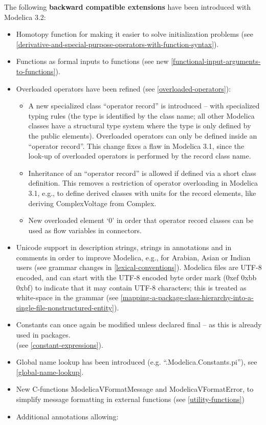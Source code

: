 The following \textbf{backward compatible extensions} have been
introduced with Modelica 3.2:

\begin{itemize}
\item
  Homotopy function for making it easier to solve initialization
  problems (see \ref{derivative-and-special-purpose-operators-with-function-syntax}).
\item
  Functions as formal inputs to functions (see new \ref{functional-input-arguments-to-functions}).
\item
  Overloaded operators have been refined (see \ref{overloaded-operators}):

  \begin{itemize}
  \item
    A new specialized class ``operator record'' is introduced -- with
    specialized typing rules (the type is identified by the class name;
    all other Modelica classes have a structural type system where the
    type is only defined by the public elements). Overloaded operators
    can only be defined inside an ``operator record''. This change fixes
    a flaw in Modelica 3.1, since the look-up of overloaded operators is
    performed by the record class name.
  \item
    Inheritance of an ``operator record'' is allowed if defined via a
    short class definition. This removes a restriction of operator
    overloading in Modelica 3.1, e.g., to define derived classes with
    units for the record elements, like deriving ComplexVoltage from
    Complex.
  \item
    New overloaded element `0' in order that operator record classes can
    be used as flow variables in connectors.
  \end{itemize}
\item
  Unicode support in description strings, strings in annotations and in
  comments in order to improve Modelica, e.g., for Arabian, Asian or
  Indian users (see grammar changes in \ref{lexical-conventions}). Modelica files are
  UTF-8 encoded, and can start with the UTF-8 encoded byte order mark
  (0xef 0xbb 0xbf) to indicate that it may contain UTF-8 characters;
  this is treated as white-space in the grammar (see \ref{mapping-a-package-class-hierarchy-into-a-single-file-nonstructured-entity}).
\item
  Constants can once again be modified unless declared final -- as this
  is already used in packages.\\
  (see \ref{constant-expressions}).
\item
  Global name lookup has been introduced (e.g.
  ``.Modelica.Constants.pi''), see \ref{global-name-lookup}.
\item
  New C-functions ModelicaVFormatMessage and ModelicaVFormatError, to
  simplify message formatting in external functions (see \ref{utility-functions})
\item
  Additional annotations allowing:


\end{itemize}

